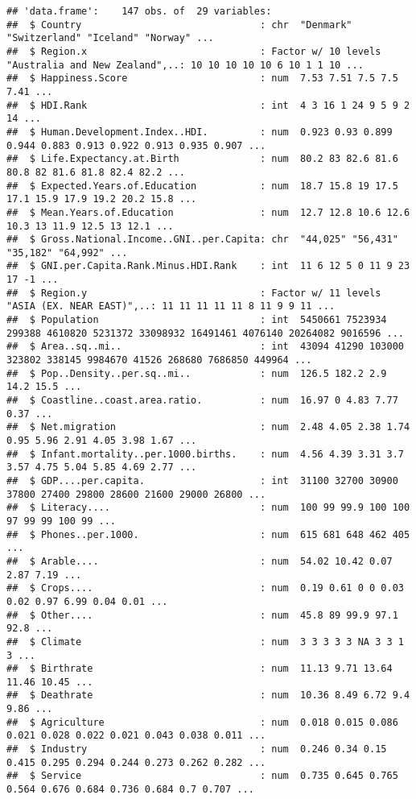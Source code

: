 \documentclass[]{article}
\begin{document}
\begin{verbatim}
## 'data.frame':    147 obs. of  29 variables:
##  $ Country                               : chr  "Denmark" "Switzerland" "Iceland" "Norway" ...
##  $ Region.x                              : Factor w/ 10 levels "Australia and New Zealand",..: 10 10 10 10 10 6 10 1 1 10 ...
##  $ Happiness.Score                       : num  7.53 7.51 7.5 7.5 7.41 ...
##  $ HDI.Rank                              : int  4 3 16 1 24 9 5 9 2 14 ...
##  $ Human.Development.Index..HDI.         : num  0.923 0.93 0.899 0.944 0.883 0.913 0.922 0.913 0.935 0.907 ...
##  $ Life.Expectancy.at.Birth              : num  80.2 83 82.6 81.6 80.8 82 81.6 81.8 82.4 82.2 ...
##  $ Expected.Years.of.Education           : num  18.7 15.8 19 17.5 17.1 15.9 17.9 19.2 20.2 15.8 ...
##  $ Mean.Years.of.Education               : num  12.7 12.8 10.6 12.6 10.3 13 11.9 12.5 13 12.1 ...
##  $ Gross.National.Income..GNI..per.Capita: chr  "44,025" "56,431" "35,182" "64,992" ...
##  $ GNI.per.Capita.Rank.Minus.HDI.Rank    : int  11 6 12 5 0 11 9 23 17 -1 ...
##  $ Region.y                              : Factor w/ 11 levels "ASIA (EX. NEAR EAST)",..: 11 11 11 11 11 8 11 9 9 11 ...
##  $ Population                            : int  5450661 7523934 299388 4610820 5231372 33098932 16491461 4076140 20264082 9016596 ...
##  $ Area..sq..mi..                        : int  43094 41290 103000 323802 338145 9984670 41526 268680 7686850 449964 ...
##  $ Pop..Density..per.sq..mi..            : num  126.5 182.2 2.9 14.2 15.5 ...
##  $ Coastline..coast.area.ratio.          : num  16.97 0 4.83 7.77 0.37 ...
##  $ Net.migration                         : num  2.48 4.05 2.38 1.74 0.95 5.96 2.91 4.05 3.98 1.67 ...
##  $ Infant.mortality..per.1000.births.    : num  4.56 4.39 3.31 3.7 3.57 4.75 5.04 5.85 4.69 2.77 ...
##  $ GDP....per.capita.                    : int  31100 32700 30900 37800 27400 29800 28600 21600 29000 26800 ...
##  $ Literacy....                          : num  100 99 99.9 100 100 97 99 99 100 99 ...
##  $ Phones..per.1000.                     : num  615 681 648 462 405 ...
##  $ Arable....                            : num  54.02 10.42 0.07 2.87 7.19 ...
##  $ Crops....                             : num  0.19 0.61 0 0 0.03 0.02 0.97 6.99 0.04 0.01 ...
##  $ Other....                             : num  45.8 89 99.9 97.1 92.8 ...
##  $ Climate                               : num  3 3 3 3 3 NA 3 3 1 3 ...
##  $ Birthrate                             : num  11.13 9.71 13.64 11.46 10.45 ...
##  $ Deathrate                             : num  10.36 8.49 6.72 9.4 9.86 ...
##  $ Agriculture                           : num  0.018 0.015 0.086 0.021 0.028 0.022 0.021 0.043 0.038 0.011 ...
##  $ Industry                              : num  0.246 0.34 0.15 0.415 0.295 0.294 0.244 0.273 0.262 0.282 ...
##  $ Service                               : num  0.735 0.645 0.765 0.564 0.676 0.684 0.736 0.684 0.7 0.707 ...
\end{verbatim}
\end{document}
